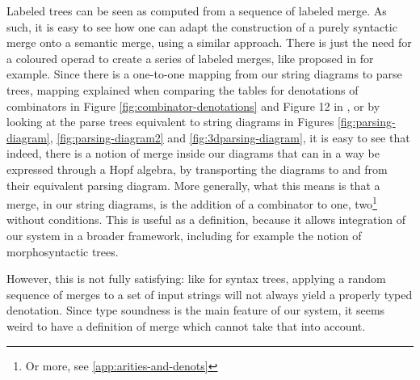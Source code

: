 \medskip

Labeled trees can be seen as computed from a sequence of labeled merge.
As such, it is easy to see how one can adapt the construction of a purely
syntactic merge onto a semantic merge, using a similar approach.
There is just the need for a coloured operad to create a series of labeled
merges, like proposed in
\cite{melliesCategoricalContoursChomskySchutzenberger2025} for example.
Since there is a one-to-one mapping from our string diagrams to parse trees,
mapping explained when comparing the tables for denotations of combinators
in Figure \ref{fig:combinator-denotations} and Figure 12 in
\cite{bumfordEffectdrivenInterpretationFunctors2025}, or by looking at the
parse trees equivalent to string diagrams in Figures \ref{fig:parsing-diagram},
\ref{fig:parsing-diagram2} and \ref{fig:3dparsing-diagram}, it is easy to see
that indeed, there is a notion of merge inside our diagrams that can in a way
be expressed through a Hopf algebra, by transporting the diagrams to and from
their equivalent parsing diagram.
More generally, what this means is that a merge, in our string diagrams, is
the addition of a combinator to one, two\footnote{Or more, see
	\ref{app:arities-and-denots}} without conditions.
This is useful as a definition, because it allows integration of our system in
a broader framework, including for example the notion of morphosyntactic trees.

\medskip

However, this is not fully satisfying: like for syntax trees, applying a random
sequence of merges to a set of input strings will not always yield a properly
typed denotation.
Since type soundness is the main feature of our system, it seems weird to have
a definition of merge which cannot take that into account.

